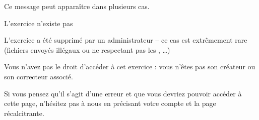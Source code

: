﻿Ce message peut apparaître dans plusieurs cas.
\item L’exercice n’existe pas
\item L’exercice a été supprimé par un administrateur -- ce cas est extrêmement rare (fichiers envoyés illégaux ou ne respectant pas les , …)
\item Vous n’avez pas le droit d’accéder à cet exercice : vous n’êtes pas son créateur ou son correcteur associé.

Si vous pensez qu’il s’agit d’une erreur et que vous devriez pouvoir accéder à cette page, n’hésitez pas à nous  en précisant votre compte et la page récalcitrante.